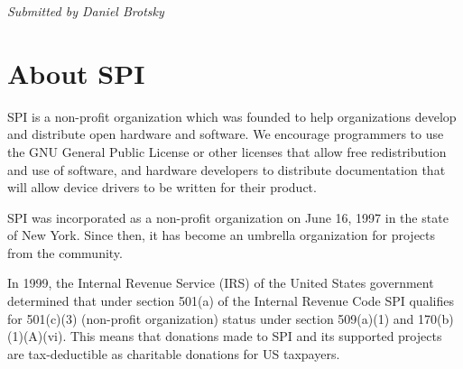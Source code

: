 \documentclass[a4paper]{report}
\begin{document}
{\em Submitted by Daniel Brotsky}


\appendix
\chapter{About SPI}

SPI is a non-profit organization which was founded to help organizations develop and distribute open hardware and software. We encourage programmers to use the GNU General Public License or other licenses that allow free redistribution and use of software, and hardware developers to distribute documentation that will allow device drivers to be written for their product.

SPI was incorporated as a non-profit organization on June 16, 1997 in the state of New York. Since then, it has become an umbrella organization for projects from the community.

In 1999, the Internal Revenue Service (IRS) of the United States government determined that under section 501(a) of the Internal Revenue Code SPI qualifies for 501(c)(3) (non-profit organization) status under section 509(a)(1) and 170(b)(1)(A)(vi). This means that donations made to SPI and its supported projects are tax-deductible as charitable donations for US taxpayers.

\newpage

\pagestyle{empty}


\null
\end{document}
